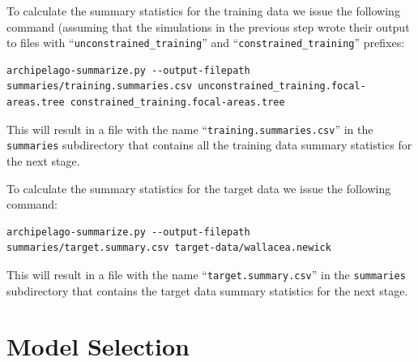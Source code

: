 \documentclass[11pt,openany]{memoir} %
\begin{document}
To calculate the summary statistics for the training data we issue the following command (assuming that the simulations in the previous step wrote their output to files with ``\texttt{unconstrained\_training}'' and ``\texttt{constrained\_training}'' prefixes:
\begin{lstlisting}
archipelago-summarize.py --output-filepath summaries/training.summaries.csv unconstrained_training.focal-areas.tree constrained_training.focal-areas.tree
\end{lstlisting}
This will result in a file with the name ``\texttt{training.summaries.csv}'' in the \texttt{summaries} subdirectory that contains all the training data summary statistics for the next stage.

To calculate the summary statistics for the target data we issue the following command:
\begin{lstlisting}
archipelago-summarize.py --output-filepath summaries/target.summary.csv target-data/wallacea.newick
\end{lstlisting}
This will result in a file with the name ``\texttt{target.summary.csv}'' in the \texttt{summaries} subdirectory that contains the target data summary statistics for the next stage.

\section{Model Selection}
\end{document}
